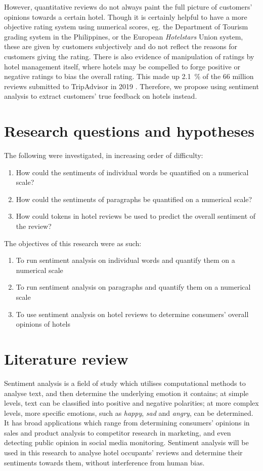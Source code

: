 \documentclass[12pt, a4paper, oneside]{pancake-article}
\begin{document}
However, quantitative reviews do not always paint the full picture of customers'
opinions towards a certain hotel. Though it is certainly helpful to have a more
objective rating system using numerical scores, eg. the Department of Tourism
grading system in the Philippines, or the European
\textit{Hotelstars} Union system,
these are given by customers subjectively and do not reflect the reasons for
customers giving the rating. There is also evidence of manipulation of ratings
by hotel management itself, where hotels may be compelled to forge positive or
negative ratings to bias the overall rating. This made up \qty{2.1}{\percent}
of the 66 million reviews submitted to TripAdvisor in 2019 \cite{tripadvisor}.
Therefore, we propose using sentiment analysis to extract customers' true
feedback on hotels instead.

\section{Research questions and hypotheses}
The following were investigated, in increasing order of difficulty:
\begin{enumerate}
  \item How could the sentiments of individual words be quantified on
    a numerical scale?
  \item How could the sentiments of paragraphs be quantified on a
    numerical scale?
  \item How could tokens in hotel reviews be used to predict the
    overall sentiment of the review?
\end{enumerate}

The objectives of this research were as such:
\begin{enumerate}
  \item To run sentiment analysis on individual words and quantify
    them on a numerical scale
  \item To run sentiment analysis on paragraphs and quantify them on
    a numerical scale
  \item To use sentiment analysis on hotel reviews to determine
    consumers' overall opinions of hotels
\end{enumerate}

\section{Literature review}
Sentiment analysis is a field of study which utilises computational
methods to analyse text,
and then determine the underlying emotion it contains; at simple
levels, text can be classified
into positive and negative polarities; at more complex levels, more
specific emotions, such as
\textit{happy}, \textit{sad} and \textit{angry}, can be determined. It
has broad applications which range from determining consumers'
opinions in sales and product
analysis to competitor research in marketing, and even detecting
public opinion in social media
monitoring. Sentiment analysis will be used in this research to
analyse hotel occupants' reviews
and determine their sentiments towards them, without interference
from human bias.
\end{document}
